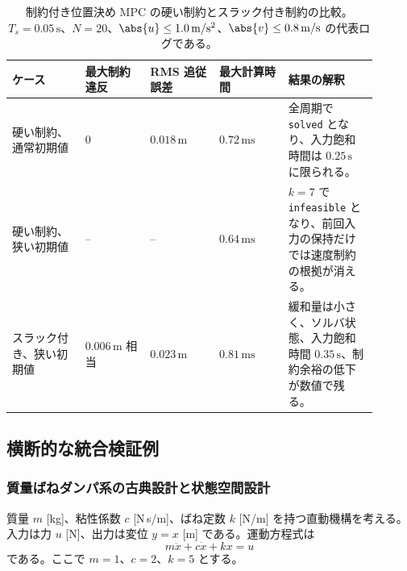 \begin{table}[tb]
  \centering
  \footnotesize
  \caption{制約付き位置決め MPC の硬い制約とスラック付き制約の比較。$T_s=0.05\,\mathrm{s}$、$N=20$、$\abs{u}\le1.0\,\mathrm{m/s^2}$、$\abs{v}\le0.8\,\mathrm{m/s}$ の代表ログである。}
  \label{tab:w08-mpc-slack-results}
  \begin{tabular}{@{}>{\raggedright\arraybackslash}p{0.18\linewidth}>{\raggedright\arraybackslash}p{0.16\linewidth}>{\raggedright\arraybackslash}p{0.17\linewidth}>{\raggedright\arraybackslash}p{0.17\linewidth}>{\raggedright\arraybackslash}p{0.22\linewidth}@{}}
    \hline
    ケース & 最大制約違反 & RMS 追従誤差 & 最大計算時間 & 結果の解釈 \\
    \hline
    硬い制約、通常初期値 &
    $0$ &
    $0.018\,\mathrm{m}$ &
    $0.72\,\mathrm{ms}$ &
    全周期で \texttt{solved} となり、入力飽和時間は $0.25\,\mathrm{s}$ に限られる。 \\
    硬い制約、狭い初期値 &
    -- &
    -- &
    $0.64\,\mathrm{ms}$ &
    $k=7$ で \texttt{infeasible} となり、前回入力の保持だけでは速度制約の根拠が消える。 \\
    スラック付き、狭い初期値 &
    $0.006\,\mathrm{m}$ 相当 &
    $0.023\,\mathrm{m}$ &
    $0.81\,\mathrm{ms}$ &
    緩和量は小さく、ソルバ状態、入力飽和時間 $0.35\,\mathrm{s}$、制約余裕の低下が数値で残る。 \\
    \hline
  \end{tabular}
\end{table}

\subsection{横断的な統合検証例}

\subsubsection{質量ばねダンパ系の古典設計と状態空間設計}

質量 $m$ [kg]、粘性係数 $c$ [N\,s/m]、ばね定数 $k$ [N/m] を持つ直動機構を考える。入力は力 $u$ [N]、出力は変位 $y=x$ [m] である。運動方程式は
\begin{equation}
  m\ddot{x}+c\dot{x}+kx=u
  \label{eq:w08-msd-model}
\end{equation}
である。ここで $m=1$、$c=2$、$k=5$ とする。

